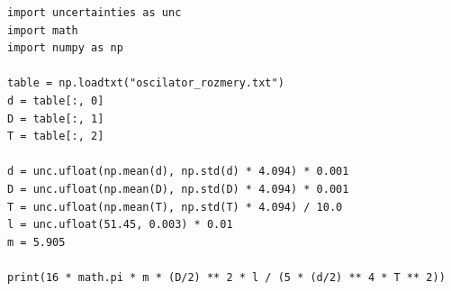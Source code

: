 \documentclass[a4paper,11pt]{article}
\begin{document}
\begin{lstlisting}[caption={Výpočet modulu pružnosti dynamickou metodou}]
import uncertainties as unc
import math
import numpy as np

table = np.loadtxt("oscilator_rozmery.txt")
d = table[:, 0]
D = table[:, 1]
T = table[:, 2]

d = unc.ufloat(np.mean(d), np.std(d) * 4.094) * 0.001
D = unc.ufloat(np.mean(D), np.std(D) * 4.094) * 0.001
T = unc.ufloat(np.mean(T), np.std(T) * 4.094) / 10.0
l = unc.ufloat(51.45, 0.003) * 0.01
m = 5.905

print(16 * math.pi * m * (D/2) ** 2 * l / (5 * (d/2) ** 4 * T ** 2))
  
\end{lstlisting}
\end{document}
